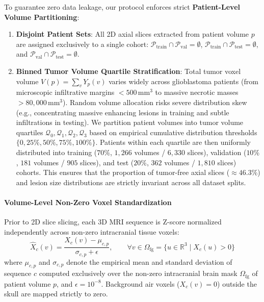 \documentclass{article}
\begin{document}
To guarantee zero data leakage, our protocol enforces strict \textbf{Patient-Level Volume Partitioning}:
\begin{enumerate}
    \item \textbf{Disjoint Patient Sets}: All 2D axial slices extracted from patient volume $p$ are assigned exclusively to a single cohort: $\mathcal{P}_{\text{train}} \cap \mathcal{P}_{\text{val}} = \emptyset$, $\mathcal{P}_{\text{train}} \cap \mathcal{P}_{\text{test}} = \emptyset$, and $\mathcal{P}_{\text{val}} \cap \mathcal{P}_{\text{test}} = \emptyset$.
    \item \textbf{Binned Tumor Volume Quartile Stratification}: Total tumor voxel volume $V(p) = \sum_{v} Y_p(v)$ varies widely across glioblastoma patients (from microscopic infiltrative margins $<500\,\text{mm}^3$ to massive necrotic masses $>80,000\,\text{mm}^3$). Random volume allocation risks severe distribution skew (e.g., concentrating massive enhancing lesions in training and subtle infiltrations in testing). We partition patient volumes into tumor volume quartiles $\mathcal{Q}_0, \mathcal{Q}_1, \mathcal{Q}_2, \mathcal{Q}_3$ based on empirical cumulative distribution thresholds $\{0, 25\%, 50\%, 75\%, 100\%\}$. Patients within each quartile are then uniformly distributed into training ($70\%$, $1,266$ volumes / $6,330$ slices), validation ($10\%$, $181$ volumes / $905$ slices), and test ($20\%$, $362$ volumes / $1,810$ slices) cohorts. This ensures that the proportion of tumor-free axial slices ($\approx 46.3\%$) and lesion size distributions are strictly invariant across all dataset splits.
\end{enumerate}

\paragraph{Volume-Level Non-Zero Voxel Standardization}
Prior to 2D slice slicing, each 3D MRI sequence is Z-score normalized independently across non-zero intracranial tissue voxels:
\begin{equation}
    \hat{X}_{c}(v) = \frac{X_c(v) - \mu_{c, p}}{\sigma_{c, p} + \epsilon}, \qquad \forall v \in \Omega_{\text{fg}} = \{u \in \mathbb{R}^3 \mid X_c(u) > 0\}
\end{equation}
where $\mu_{c, p}$ and $\sigma_{c, p}$ denote the empirical mean and standard deviation of sequence $c$ computed exclusively over the non-zero intracranial brain mask $\Omega_{\text{fg}}$ of patient volume $p$, and $\epsilon = 10^{-8}$. Background air voxels ($X_c(v) = 0$) outside the skull are mapped strictly to zero. 
\end{document}
